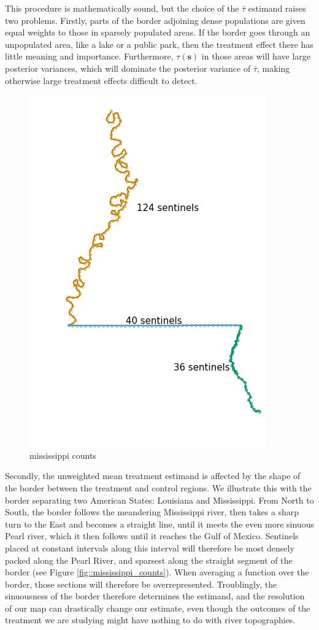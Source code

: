 \documentclass[letter]{article}
\makeatletter
\def\maxwidth{\ifdim\Gin@nat@width>\linewidth\linewidth
    \else\Gin@nat@width\fi}
\let\Oldincludegraphics\includegraphics
\renewcommand{\includegraphics}[1]{\Oldincludegraphics[width=.8\maxwidth]{#1}}
\newcommand{\svec}{\mathbold{s}}
\newcommand{\linavg}{\bar{\tau}}
\makeatother
\begin{document}
This procedure is mathematically sound, but the choice of the
\(\linavg\) estimand raises two problems. Firstly, parts of the border
adjoining dense populations are given equal weights to those in sparsely
populated areas. If the border goes through an unpopulated area, like a
lake or a public park, then the treatment effect there has little
meaning and importance. Furthermore, \(\tau(\svec)\) in those areas will
have large posterior variances, which will dominate the posterior
variance of \(\linavg\), making otherwise large treatment effects
difficult to detect.

\begin{figure}
\centering
\includegraphics{figures/mississippi_counts.png}
\caption{mississippi counts}
\end{figure}

Secondly, the unweighted mean treatment estimand is affected by the
shape of the border between the treatment and control regions. We
illustrate this with the border separating two American States:
Louisiana and Mississippi. From North to South, the border follows the
meandering Mississippi river, then takes a sharp turn to the East and
becomes a straight line, until it meets the even more sinuous Pearl
river, which it then follows until it reaches the Gulf of Mexico.
Sentinels placed at constant intervals along this interval will
therefore be most densely packed along the Pearl River, and sparsest
along the straight segment of the border (see Figure
\ref{fig::mississippi_counts}). When averaging a function over the
border, those sections will therefore be overrepresented. Troublingly,
the sinuousness of the border therefore determines the estimand, and the
resolution of our map can drastically change our estimate, even though
the outcomes of the treatment we are studying might have nothing to do
with river topographies.
\end{document}
